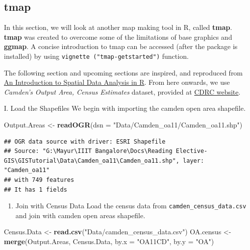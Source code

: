 \documentclass[]{article}
\newenvironment{Shaded}{}{}
\newcommand{\DataTypeTok}[1]{\textcolor[rgb]{0.56,0.13,0.00}{#1}}
\newcommand{\KeywordTok}[1]{\textcolor[rgb]{0.00,0.44,0.13}{\textbf{#1}}}
\newcommand{\NormalTok}[1]{#1}
\newcommand{\StringTok}[1]{\textcolor[rgb]{0.25,0.44,0.63}{#1}}
\providecommand{\tightlist}{%
  \setlength{\itemsep}{0pt}\setlength{\parskip}{0pt}}
\begin{document}
\hypertarget{tmap}{%
\subsection{tmap}\label{tmap}}

In this section, we will look at another map making tool in R, called
\textbf{tmap}. \textbf{tmap} was created to overcome some of the
limitations of base graphics and \textbf{ggmap}. A concise introduction
to tmap can be accessed (after the package is installed) by using
\texttt{vignette\ ("tmap-getstarted")} function.

The following section and upcoming sections are inspired, and reproduced
from
\href{http://www.spatialanalysisonline.com/An\%20Introduction\%20to\%20Spatial\%20Data\%20Analysis\%20in\%20R.pdf}{An
Introduction to Spatial Data Analysis in R}. From here onwards, we use
\emph{Camden's Output Area, Census Estimates} dataset, provided at
\href{https://data.cdrc.ac.uk/tutorial/an-introduction-to-spatial-data-analysis-and-visualisation-in-r}{CDRC
website}.

I. Load the Shapefiles We begin with importing the camden open area
shapefile.

\begin{Shaded}
\begin{Highlighting}[]
\NormalTok{Output.Areas <-}\StringTok{ }\KeywordTok{readOGR}\NormalTok{(}\DataTypeTok{dsn =} \StringTok{"Data/Camden_oa11/Camden_oa11.shp"}\NormalTok{)}
\end{Highlighting}
\end{Shaded}

\begin{verbatim}
## OGR data source with driver: ESRI Shapefile 
## Source: "G:\Mayur\IIIT Bangalore\Docs\Reading Elective-GIS\GISTutorial\Data\Camden_oa11\Camden_oa11.shp", layer: "Camden_oa11"
## with 749 features
## It has 1 fields
\end{verbatim}

\begin{enumerate}
\def\labelenumi{\Roman{enumi}.}
\setcounter{enumi}{1}
\tightlist
\item
  Join with Census Data Load the census data from
  \texttt{camden\_census\_data.csv} and join with camden open areas
  shapefile.
\end{enumerate}

\begin{Shaded}
\begin{Highlighting}[]
\NormalTok{Census.Data <-}\StringTok{ }\KeywordTok{read.csv}\NormalTok{(}\StringTok{"Data/camden_census_data.csv"}\NormalTok{)}
\NormalTok{OA.census <-}\StringTok{ }\KeywordTok{merge}\NormalTok{(Output.Areas, Census.Data, }\DataTypeTok{by.x =} \StringTok{"OA11CD"}\NormalTok{, }\DataTypeTok{by.y =} \StringTok{"OA"}\NormalTok{)}
\end{Highlighting}
\end{Shaded}
\end{document}
